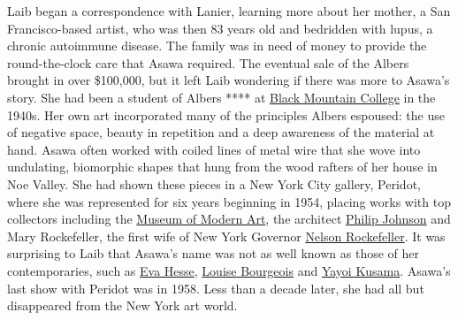Laib began a correspondence with Lanier, learning more about her mother,
a San Francisco-based artist, who was then 83 years old and bedridden
with lupus, a chronic autoimmune disease. The family was in need of
money to provide the round-the-clock care that Asawa required. The
eventual sale of the Albers brought in over \$100,000, but it left Laib
wondering if there was more to Asawa's story. She had been a student of
Albers **** at
\href{https://www.nytimes3xbfgragh.onion/2015/03/19/arts/artsspecial/in-the-spirit-of-black-mountain-college-an-avant-garde-incubator.html}{Black
Mountain College} in the 1940s. Her own art incorporated many of the
principles Albers espoused: the use of negative space, beauty in
repetition and a deep awareness of the material at hand. Asawa often
worked with coiled lines of metal wire that she wove into undulating,
biomorphic shapes that hung from the wood rafters of her house in Noe
Valley. She had shown these pieces in a New York City gallery, Peridot,
where she was represented for six years beginning in 1954, placing works
with top collectors including the
\href{https://www.nytimes3xbfgragh.onion/topic/organization/museum-of-modern-art}{Museum
of Modern Art}, the architect
\href{https://www.nytimes3xbfgragh.onion/2017/03/23/t-magazine/philip-johnson-rockefeller-guest-house-manhattan.html}{Philip
Johnson} and Mary Rockefeller, the first wife of New York Governor
\href{https://www.nytimes3xbfgragh.onion/1964/02/16/archives/political-evolution-of-nelson-rockefeller-in-less-than-six-years-he.html}{Nelson
Rockefeller}. It was surprising to Laib that Asawa's name was not as
well known as those of her contemporaries, such as
\href{https://tmagazine.blogs.nytimes3xbfgragh.onion/2010/03/25/just-looking-eva-hesse/}{Eva
Hesse},
\href{https://www.nytimes3xbfgragh.onion/2016/10/03/t-magazine/art/louise-bourgeois-turning-inwards.html}{Louise
Bourgeois} and
\href{https://www.nytimes3xbfgragh.onion/2016/09/01/t-magazine/art/yayoi-kusama-glass-house.html}{Yayoi
Kusama}. Asawa's last show with Peridot was in 1958. Less than a decade
later, she had all but disappeared from the New York art world.

